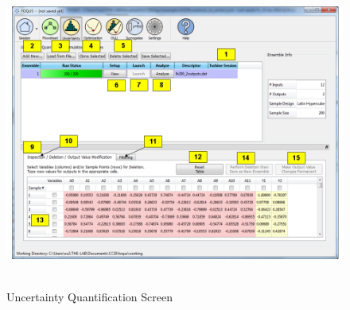 \begin{figure}[H]
\centering \includegraphics[width=6.5in,height=4in,keepaspectratio]{Chapt_uq/figs/overview/1_UQScreen2}
\caption{Uncertainty Quantification Screen}
\label{fig:uq_screen}
\end{figure}
